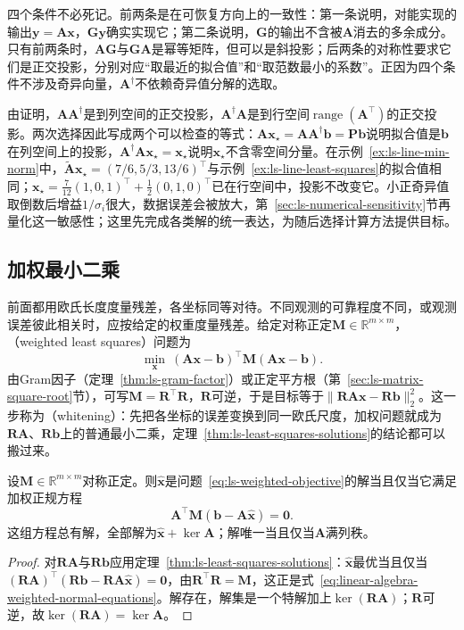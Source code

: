 四个条件不必死记。前两条是在可恢复方向上的一致性：第一条说明，对能实现的输出$\bm y=\bm A\bm x$，$\bm G\bm y$确实实现它；第二条说明，$\bm G$的输出不含被$\bm A$消去的多余成分。只有前两条时，$\bm A\bm G$与$\bm G\bm A$是幂等矩阵，但可以是斜投影；后两条的对称性要求它们是正交投影，分别对应“取最近的拟合值”和“取范数最小的系数”。正因为四个条件不涉及奇异向量，$\bm A^\dagger$不依赖奇异值分解的选取。

由证明，$\bm A\bm A^\dagger$是到列空间的正交投影，$\bm A^\dagger\bm A$是到行空间$\operatorname{range}(\bm A^\top)$的正交投影。两次选择因此写成两个可以检查的等式：$\bm A\bm x_\star=\bm A\bm A^\dagger\bm b=\bm P\bm b$说明拟合值是$\bm b$在列空间上的投影，$\bm A^\dagger\bm A\bm x_\star=\bm x_\star$说明$\bm x_\star$不含零空间分量。在示例~\ref{ex:ls-line-min-norm}中，$\widetilde{\bm A}\bm x_\star=(7/6,5/3,13/6)^\top$与示例~\ref{ex:ls-line-least-squares}的拟合值相同；$\bm x_\star=\frac7{12}(1,0,1)^\top+\frac12(0,1,0)^\top$已在行空间中，投影不改变它。小正奇异值取倒数后增益$1/\sigma_i$很大，数据误差会被放大，第~\ref{sec:ls-numerical-sensitivity}节再量化这一敏感性；这里先完成各类解的统一表达，为随后选择计算方法提供目标。

\subsection{加权最小二乘}
\label{sec:ls-weighted-ls}

前面都用欧氏长度度量残差，各坐标同等对待。不同观测的可靠程度不同，或观测误差彼此相关时，应按给定的权重度量残差。给定对称正定$\bm M\in\mathbb R^{m\times m}$，（weighted least squares）问题为
\begin{equation}
 \min_{\bm x}\ (\bm A\bm x-\bm b)^\top\bm M(\bm A\bm x-\bm b).
 \label{eq:ls-weighted-objective}
\end{equation}
由Gram因子（定理~\ref{thm:ls-gram-factor}）或正定平方根（第~\ref{sec:ls-matrix-square-root}节），可写$\bm M=\bm R^\top\bm R$，$\bm R$可逆，于是目标等于$\lVert\bm R\bm A\bm x-\bm R\bm b\rVert_2^2$。这一步称为（whitening）：先把各坐标的误差变换到同一欧氏尺度，加权问题就成为$\bm R\bm A$、$\bm R\bm b$上的普通最小二乘，定理~\ref{thm:ls-least-squares-solutions}的结论都可以搬过来。

\begin{theorem}[加权最小二乘解的刻画]
\label{thm:ls-weighted-least-squares}
设$\bm M\in\mathbb R^{m\times m}$对称正定。则$\hat{\bm x}$是问题~\eqref{eq:ls-weighted-objective}的解当且仅当它满足加权正规方程
\begin{equation}
 \bm A^\top\bm M(\bm b-\bm A\hat{\bm x})=\bm0 .
 \label{eq:linear-algebra-weighted-normal-equations}
\end{equation}
这组方程总有解，全部解为$\hat{\bm x}+\ker\bm A$；解唯一当且仅当$\bm A$满列秩。
\end{theorem}
\begin{proof}
对$\bm R\bm A$与$\bm R\bm b$应用定理~\ref{thm:ls-least-squares-solutions}：$\hat{\bm x}$最优当且仅当$(\bm R\bm A)^\top(\bm R\bm b-\bm R\bm A\hat{\bm x})=\bm0$，由$\bm R^\top\bm R=\bm M$，这正是式~\eqref{eq:linear-algebra-weighted-normal-equations}。解存在，解集是一个特解加上$\ker(\bm R\bm A)$；$\bm R$可逆，故$\ker(\bm R\bm A)=\ker\bm A$。
\end{proof}

